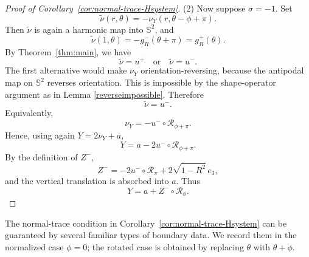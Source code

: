 \documentclass[11pt]{amsart}
\numberwithin{equation}{section}
\theoremstyle{remark}
\newcommand{\Sph}{\mathbb{S}^2}
\newcommand{\RR}{\mathbb R}
\newcommand{\eiii}{e_3}
\newcommand{\Rot}{\mathcal R}
\begin{document}
\begin{proof}[Proof of Corollary~\ref{cor:normal-trace-Hsystem}]
\smallskip
(2) Now suppose $\sigma=-1$. Set
\[
\widetilde\nu(r,\theta)=-\nu_Y(r,\theta-\phi+\pi).
\]
Then $\widetilde\nu$ is again a harmonic map into $\Sph$, and
\[
\widetilde\nu(1,\theta)
=-g_R^-(\theta+\pi)
=g_R^+(\theta).
\]
By Theorem~\ref{thm:main}, we have
\[
\widetilde\nu=u^+\quad\text{or}\quad \widetilde\nu=u^-.
\]
The first alternative would make $\nu_Y$ orientation-reversing, because the antipodal map on $\Sph$ reverses orientation. This is impossible
by the shape-operator argument as in Lemma \ref{reverseimpossible}. Therefore
\[
\widetilde\nu=u^-.
\]
Equivalently,
\[
\nu_Y=-u^-\circ\Rot_{\phi+\pi}.
\]
Hence, using again $Y=2\nu_Y+a$,
\[
Y=a-2u^-\circ\Rot_{\phi+\pi}.
\]
By the definition of $Z^-$,
\[
Z^-= -2u^-\circ\Rot_\pi+2\sqrt{1-R^2}\,\eiii,
\]
and the vertical translation is absorbed into $a$. Thus
\[
Y=a+Z^-\circ\Rot_\phi.
\]

\end{proof}

The normal-trace condition in Corollary~\ref{cor:normal-trace-Hsystem} can be guaranteed by several familiar types of boundary data. We record
them in the normalized case $\phi=0$; the rotated case is obtained by replacing $\theta$ with $\theta+\phi$.
\end{document}

